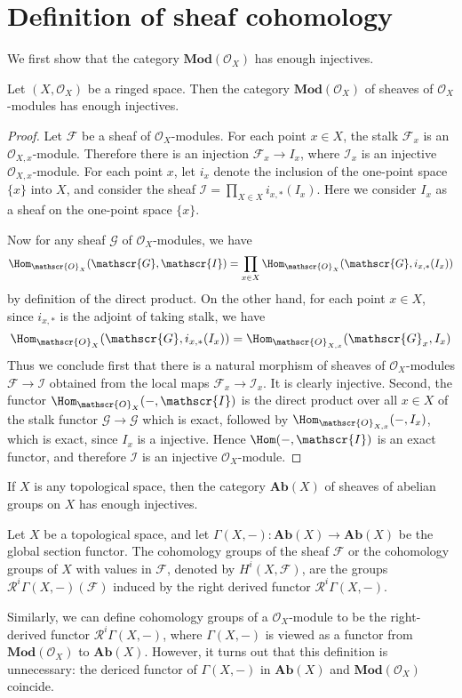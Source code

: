 \section{Definition of sheaf cohomology}
We first show that the category $\mathbf{Mod}(\mathscr{O}_X)$ has enough injectives.
\begin{proposition}
Let $(X,\mathscr{O}_X)$ be a ringed space. Then the category $\mathbf{Mod}(\mathscr{O}_X)$ of sheaves of $\mathscr{O}_X$-modules has enough injectives.
\end{proposition}
\begin{proof}
Let $\mathscr{F}$ be a sheaf of $\mathscr{O}_X$-modules. For each point $x\in X$, the stalk $\mathscr{F}_x$ is an $\mathscr{O}_{X,x}$-module. Therefore there is an injection $\mathscr{F}_x\to I_x$, where $\mathscr{I}_x$ is an injective $\mathscr{O}_{X,x}$-module. For each point $x$, let $i_x$ denote the inclusion of the one-point space $\{x\}$ into $X$, and consider the sheaf $\mathscr{I}=\prod_{X\in X}i_{x,*}(I_x)$. Here we consider $I_x$ as a sheaf on the one-point space $\{x\}$.\par
Now for any sheaf $\mathscr{G}$ of $\mathscr{O}_X$-modules, we have
\[\Hom_{\mathscr{O}_{X}}(\mathscr{G},\mathscr{I})=\prod_{x\in X}\Hom_{\mathscr{O}_{X}}(\mathscr{G},i_{x,*}(I_x))\] 
by definition of the direct product. On the other hand, for each point $x\in X$, since $i_{x,*}$ is the adjoint of taking stalk, we have
\[\Hom_{\mathscr{O}_{X}}(\mathscr{G},i_{x,*}(I_x))=\Hom_{\mathscr{O}_{X,x}}(\mathscr{G}_x,I_x)\]
Thus we conclude first that there is a natural morphism of sheaves of $\mathscr{O}_X$-modules $\mathscr{F}\to\mathscr{I}$ obtained from the local maps $\mathscr{F}_x\to\mathscr{I}_x$. It is clearly injective. Second, the functor $\Hom_{\mathscr{O}_{X}}(-,\mathscr{I})$ is the direct product over all $x\in X$ of the stalk functor $\mathscr{G}\to\mathscr{G}$ which is exact, followed by $\Hom_{\mathscr{O}_{X,x}}(-,I_x)$, which is exact, since $I_x$ is a injective. Hence $\Hom(-,\mathscr{I})$ is an exact functor, and therefore $\mathscr{I}$ is an injective $\mathscr{O}_X$-module.
\end{proof}
\begin{corollary}
If $X$ is any topological space, then the category $\mathbf{Ab}(X)$ of sheaves of abelian groups on $X$ has enough injectives.
\end{corollary}
\begin{definition}
Let $X$ be a topological space, and let $\Gamma(X,-):\mathbf{Ab}(X)\to\mathbf{Ab}(X)$ be the global section functor. The cohomology groups of the sheaf $\mathscr{F}$ or the cohomology groups of $X$ with values in $\mathscr{F}$, denoted by $H^i(X,\mathscr{F})$, are the groups $\mathcal{R}^i\Gamma(X,-)(\mathscr{F})$ induced by the right derived functor $\mathcal{R}^i\Gamma(X,-)$.
\end{definition}
Similarly, we can define cohomology groups of a $\mathscr{O}_X$-module to be the right-derived functor $\mathcal{R}^i\Gamma(X,-)$, where $\Gamma(X,-)$ is viewed as a functor from $\mathbf{Mod}(\mathcal{O}_X)$ to $\mathbf{Ab}(X)$. However, it turns out that this definition is unnecessary: the dericed functor of $\Gamma(X,-)$ in $\mathbf{Ab}(X)$ and $\mathbf{Mod}(\mathscr{O}_X)$ coincide.
